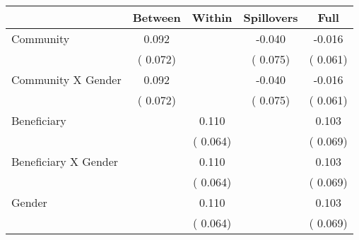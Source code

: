 
\begin{tabular}{l*{4}{c}}\hline&\multicolumn{1}{c}{Between}&\multicolumn{1}{c}{Within}&\multicolumn{1}{c}{Spillovers}&\multicolumn{1}{c}{Full}\\ \hline
 Community                                     &              0.092      &                                               &       -0.040 &        -0.016                            \\ 
                                                       &        (       0.072)           &                                       &       (       0.075)     &      (       0.061)                                           \\ 
 Community X Gender            &              0.092      &                                               &       -0.040 &        -0.016                            \\ 
                                                       &        (       0.072)           &                                       &       (       0.075)     &      (       0.061)                                           \\ 
 Beneficiary                           &                                               &        0.110    &                                &             0.103                            \\ 
                                                       &                                               & (       0.064)                  &                                        &      (       0.069)                                           \\ 
 Beneficiary X Gender          &                                               &        0.110    &                                &             0.103                            \\ 
                                                       &                                               & (       0.064)                  &                                        &      (       0.069)                                           \\ 
 Gender                                        &                              &        0.110    &                                &             0.103                            \\ 
                                                       &                                               & (       0.064)                  &                                        &      (       0.069)                                           \\ 

\end{tabular}
